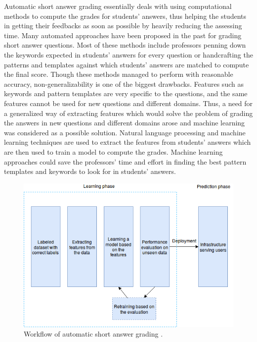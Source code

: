 Automatic short answer grading essentially deals with using computational methods to compute the grades for students' answers, thus helping the students in getting their feedbacks as soon as possible by heavily reducing the assessing time. Many automated approaches have been proposed in the past for grading short answer questions. Most of these methods include professors penning down the keywords expected in students' answers for every question or handcrafting the patterns and templates against which students' answers are matched to compute the final score. Though these methods managed to perform with reasonable accuracy, non-generalizability is one of the biggest drawbacks. Features such as keywords and pattern templates are very specific to the questions, and the same features cannot be used for new questions and different domains. Thus, a need for a generalized way of extracting features which would solve the problem of grading the answers in new questions and different domains arose and machine learning was considered as a possible solution. Natural language processing and machine learning techniques are used to extract the features from students' answers which are then used to train a model to compute the grades. Machine learning approaches could save the professors' time and effort in finding the best pattern templates and keywords to look for in students' answers.


\vspace{3mm}
\begin{figure}[h!]
	\centering
	\includegraphics[scale=0.6]{images/simpler_model_1}
	\caption{Workflow of automatic short answer grading \cite{Burrows2015}.}
	\label{auto_workflow}
\end{figure}


